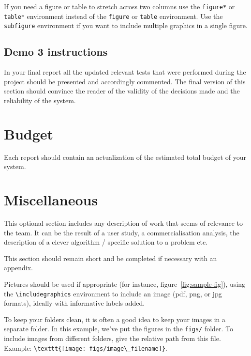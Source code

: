 \documentclass{article}
\begin{document}
If you need a figure or table to stretch across two columns use the \verb+figure*+ or \verb+table*+ environment instead of the \verb+figure+ or \verb+table+ environment.  Use the \verb+subfigure+ environment if you want to include multiple graphics in a single figure.

\subsection*{Demo 3 instructions}
In your final report all the updated relevant tests that were performed during the project should be presented and accordingly commented.
The final version of this section should convince the reader of the validity of the decisions made and the reliability of the system.

\section{Budget}
Each report should contain an actualization of the estimated total budget 
of your system.

\section{Miscellaneous}
This optional section includes any description of work that seems of relevance to the team. It can be the result of a user study, a commercialisation analysis, the description of a clever algorithm / specific solution to a problem etc.

This section should remain short and be completed if necessary with an appendix.

Pictures should be used if appropriate (for instance, figure~\ref{fig:sample-fig}), using the \verb+\includegraphics+ environment to include an image (pdf, png, or jpg formats), ideally with informative labels added. 

To keep your folders clean, it is often a good idea to keep your images in a separate folder. In this example, we've put the figures in the \texttt{figs/} folder. To include images from different folders, give the relative path from this file. Example: \verb+\texttt{[image: figs/image\_filename]}+.
\end{document}
